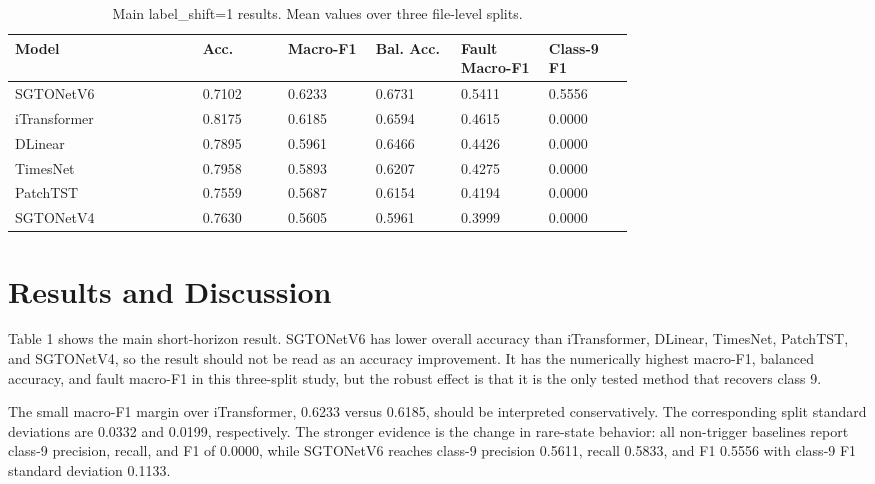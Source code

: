 \documentclass[12pt]{article}
\begin{document}
\begin{table}[t]
                \caption{Main label\_shift=1 results. Mean values over three file-level splits.}
                \centering
                \scriptsize
                \setlength{\tabcolsep}{2.5pt}
                \renewcommand{\arraystretch}{1.05}
                \begin{tabular}{@{}p{0.22\linewidth}p{0.10\linewidth} p{0.10\linewidth} p{0.10\linewidth} p{0.10\linewidth} p{0.10\linewidth}@{}}
                \toprule
                Model & Acc. & Macro-F1 & Bal. Acc. & Fault Macro-F1 & Class-9 F1 \\ \midrule
SGTONetV6 & 0.7102 & 0.6233 & 0.6731 & 0.5411 & 0.5556 \\
iTransformer & 0.8175 & 0.6185 & 0.6594 & 0.4615 & 0.0000 \\
DLinear & 0.7895 & 0.5961 & 0.6466 & 0.4426 & 0.0000 \\
TimesNet & 0.7958 & 0.5893 & 0.6207 & 0.4275 & 0.0000 \\
PatchTST & 0.7559 & 0.5687 & 0.6154 & 0.4194 & 0.0000 \\
SGTONetV4 & 0.7630 & 0.5605 & 0.5961 & 0.3999 & 0.0000 \\
                \bottomrule
                \end{tabular}
                \end{table}
\section{Results and Discussion}
Table 1 shows the main short-horizon result. SGTONetV6 has lower overall accuracy than iTransformer, DLinear, TimesNet, PatchTST, and SGTONetV4, so the result should not be read as an accuracy improvement. It has the numerically highest macro-F1, balanced accuracy, and fault macro-F1 in this three-split study, but the robust effect is that it is the only tested method that recovers class 9.

The small macro-F1 margin over iTransformer, 0.6233 versus 0.6185, should be interpreted conservatively. The corresponding split standard deviations are 0.0332 and 0.0199, respectively. The stronger evidence is the change in rare-state behavior: all non-trigger baselines report class-9 precision, recall, and F1 of 0.0000, while SGTONetV6 reaches class-9 precision 0.5611, recall 0.5833, and F1 0.5556 with class-9 F1 standard deviation 0.1133.
\end{document}
